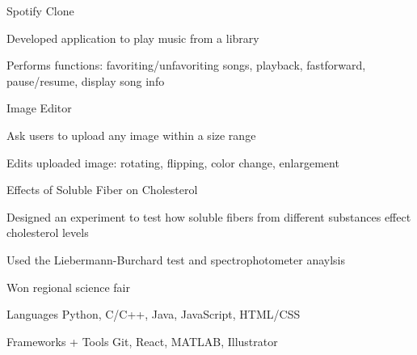 \documentclass[12pt, letterpaper]{awesome-cv}
\begin{document}
\begin{cventries}
  \cventry
    {} %
    {Spotify Clone} %
    {} %
    {} %
    {
      \vspace{-0.2in}
      \begin{cvitems} %
        \vspace{-0.5in}
        \item {Developed application to play music from a library}
        \item {Performs functions: favoriting/unfavoriting songs, playback, fastforward, pause/resume, display song info}
      \end{cvitems}
    }

  \cventry
    {} %
    {Image Editor} %
    {} %
    {} %
    {
      \vspace{-0.2in}
      \begin{cvitems} %
        \vspace{-0.1in}
        \item {Ask users to upload any image within a size range}
        \item {Edits uploaded image: rotating, flipping, color change, enlargement}
      \end{cvitems}
    }

    \cventry
    {} %
    {Effects of Soluble Fiber on Cholesterol} %
    {} %
    {} %
    {
      \vspace{-0.2in}
      \begin{cvitems} %
        \item {Designed an experiment to test how soluble fibers from different substances effect cholesterol levels}
        \item {Used the Liebermann-Burchard test and spectrophotometer anaylsis}
        \item {Won regional science fair}
      \end{cvitems}
    }
\end{cventries}

\begin{cvskills}
  \cvskill
    {Languages} %
    {Python, C/C++, Java, JavaScript, HTML/CSS} %

  \cvskill
    {Frameworks + Tools} %
    {Git, React, MATLAB, Illustrator} %
  
    
\end{cvskills}

\end{document}
